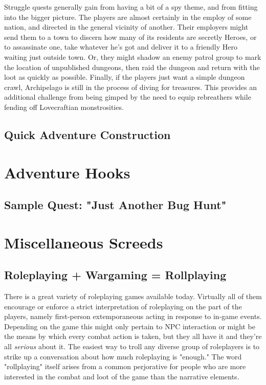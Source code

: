 \documentclass[12pt,a4paper,twocolumn]{article}
\begin{document}
\begin{itemize}
Struggle quests generally gain from having a bit of a spy theme, and from fitting into the bigger picture.  The players are almost certainly in the employ of some nation, and directed in the general vicinity of another.  Their employers might send them to a town to discern how many of its residents are secretly Heroes, or to assassinate one, take whatever he's got and deliver it to a friendly Hero waiting just outside town.  Or, they might shadow an enemy patrol group to mark the location of unpublished dungeons, then raid the dungeon and return with the loot as quickly as possible.  Finally, if the players just want a simple dungeon crawl, Archipelago is still in the process of diving for treasures.  This provides an additional challenge from being gimped by the need to equip rebreathers while fending off Lovecraftian monstrosities.  

\end{itemize} 

\subsection{Quick Adventure Construction}

\section{Adventure Hooks}

\subsection{Sample Quest: "Just Another Bug Hunt"}

\section{Miscellaneous Screeds}
\subsection{Roleplaying + Wargaming = Rollplaying}
There is a great variety of roleplaying games available today.  Virtually all of them encourage or enforce a strict interpretation of roleplaying on the part of the players, namely first-person extemporaneous acting in response to in-game events.  Depending on the game this might only pertain to NPC interaction or might be the means by which every combat action is taken, but they all have it and they're all {\em serious} about it.  The easiest way to troll any diverse group of roleplayers is to strike up a conversation about how much roleplaying is "enough."  The word "rollplaying" itself arises from a common perjorative for people who are more interested in the combat and loot of the game than the narrative elements.
\end{document}
